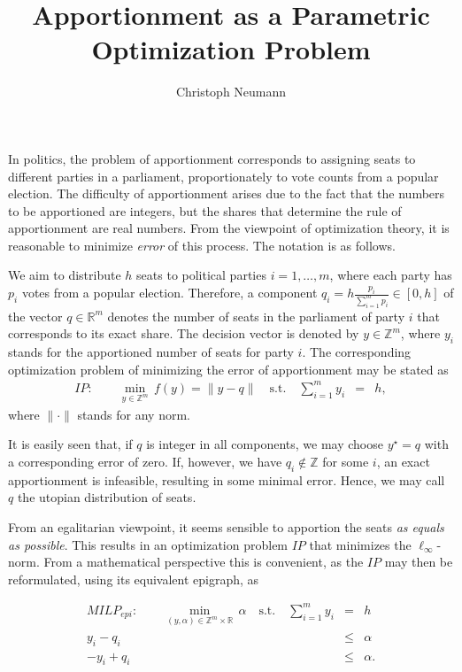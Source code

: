 \documentclass[12pt]{article}
\newcommand{\Z}{\mathbb{Z}}
\newcommand{\R}{\mathbb{R}}
\newcommand{\st}{\quad\mbox{s.t.}\quad}
\begin{document}
 
 
\title{Apportionment as a Parametric Optimization Problem}
\author{Christoph Neumann}
\maketitle
In politics, the problem of apportionment corresponds to assigning seats to different parties in a parliament, proportionately to vote counts from a popular election. The difficulty of apportionment arises due to the fact that the numbers to be apportioned are integers, but the shares that determine the rule of apportionment are real numbers. From the viewpoint of optimization theory, it is reasonable to minimize \emph{error} of this process. 
The notation is as follows.

We aim to distribute $h$ seats to political parties $i = 1,\dots, m$, where each party has $p_i$ votes from a popular election. Therefore, a component $q_i = h \frac{p_i}{\sum_{i=1}^m p_i} \in [0,h]$ of the vector $q\in \R^m$ denotes the number of seats in the parliament of party $i$ that corresponds to its exact share. The decision vector is denoted by $y \in \Z^m$, where $y_i$ stands for the apportioned number of seats for party $i$.  
The corresponding optimization problem of minimizing the error of apportionment may be stated as
\begin{eqnarray*}
IP:\qquad \min_{y\in\Z^m}\,f(y) = \|y - q\| \st \sum_{i=1}^m y_i & = & h, \end{eqnarray*}
where $\|\cdot\|$ stands for any norm.

It is easily seen that, if $q$ is integer in all components, we may choose $y^\star=q$ with a corresponding error of zero. If, however, we have $q_i \not \in \Z$ for some $i$, an exact apportionment is infeasible, resulting in some minimal error. Hence, we may call $q$ the utopian distribution of seats.

From an egalitarian viewpoint, it seems sensible to apportion the seats \emph{as equals as possible}. This results in an optimization problem $IP$ that minimizes the $\ell_\infty$-norm. From a mathematical perspective this is convenient, as the $IP$ may then be reformulated, using its equivalent epigraph, as  

\begin{eqnarray*}
MILP_{epi}:\qquad \min_{(y, \alpha) \in\Z^m \times \R}\,\alpha \st \sum_{i=1}^m y_i & = & h \\
																	y_i - q_i &\leq & \alpha \\
                                                                    -y_i + q_i & \leq & \alpha.
\end{eqnarray*}
\end{document}
